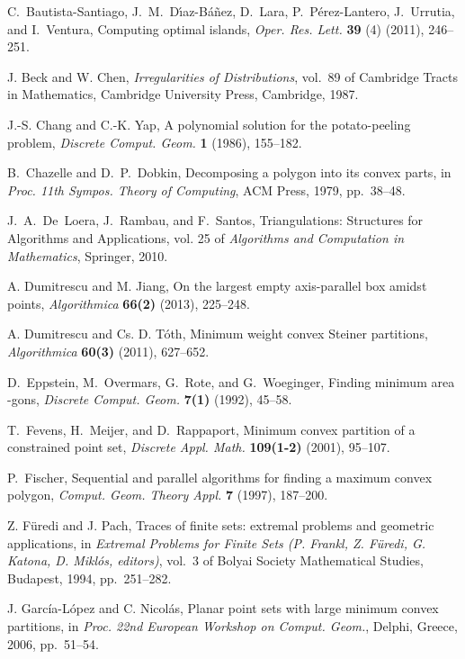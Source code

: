 \documentclass[11pt]{article}
\begin{document}
\begin{thebibliography}{99}
C.~Bautista-Santiago, J.~M.~D\'{\i}az-B\'a\~{n}ez, D.~Lara,
P.~P\'erez-Lantero, J.~Urrutia, and I.~Ventura,
Computing optimal islands,
\emph{Oper. Res. Lett.} {\bf 39} (4) (2011), 246--251.

J. Beck and W. Chen,
\emph{Irregularities of Distributions},
vol.~89 of Cambridge Tracts in Mathematics,
Cambridge University Press, Cambridge, 1987.

J.-S. Chang and C.-K. Yap,
A polynomial solution for the potato-peeling problem,
\emph{Discrete Comput. Geom.} \textbf{1} (1986), 155--182.

B.~Chazelle and D.~P.~Dobkin,
Decomposing a polygon into its convex parts,
in \emph{Proc. 11th Sympos. Theory of Computing}, ACM Press, 1979, pp.~38--48.

J.~A.~De~Loera, J.~Rambau, and F.~Santos,
Triangulations: Structures for Algorithms and Applications,
vol. 25 of \emph{Algorithms and Computation in Mathematics},
Springer, 2010.

A. Dumitrescu and M. Jiang,
On the largest empty axis-parallel box amidst  points,
\emph{Algorithmica} \textbf{66(2)} (2013), 225--248.

A. Dumitrescu and Cs. D. T\'oth,
Minimum weight convex Steiner partitions,
\emph{Algorithmica} \textbf{60(3)} (2011), 627--652.

D.~Eppstein, M.~Overmars, G.~Rote, and G.~Woeginger,
Finding minimum area -gons,
\emph{Discrete Comput. Geom.} \textbf{7(1)} (1992), 45--58.

T.~Fevens, H.~Meijer, and D.~Rappaport,
Minimum convex partition of a constrained point set,
\emph{Discrete Appl. Math.} \textbf{109(1-2)} (2001), 95--107.

P.~Fischer,
Sequential and parallel algorithms for finding a maximum convex polygon,
\emph{Comput. Geom. Theory Appl.} {\bf 7} (1997), 187--200.

Z. F\"uredi and J. Pach,
Traces of finite sets: extremal problems and geometric applications,
in \emph{Extremal Problems for Finite Sets
(P. Frankl, Z. F\"uredi, G. Katona, D. Mikl\'os, editors)},
vol.~3 of Bolyai Society Mathematical Studies, Budapest, 1994,
pp.~251--282.

J. Garc\'ia-L\'opez and C. Nicol\'as,
Planar point sets with large minimum convex partitions,
in \emph{Proc. 22nd European Workshop on Comput. Geom.},
Delphi, Greece, 2006, pp.~51--54.


\end{thebibliography}
\end{document}
